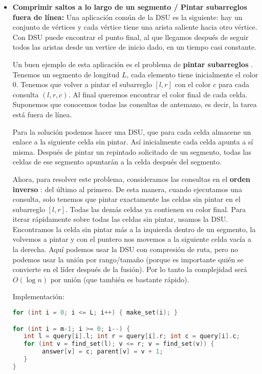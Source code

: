 \begin{itemize}
	 \item \textbf{Comprimir saltos a lo largo de un segmento / Pintar subarreglos fuera de línea:} Una aplicación común de la DSU es la siguiente: hay un conjunto de vértices y cada vértice tiene una arista saliente hacia otro vértice. Con DSU puede encontrar el punto final, al que llegamos después de seguir todos las aristas desde un vertice de inicio dado, en un tiempo casi constante.
	 
	 Un buen ejemplo de esta aplicación es el problema de \textbf{pintar subarreglos} . Tenemos un segmento de  
	 longitud $L$, cada elemento tiene inicialmente el color 0. Tenemos que volver a pintar el 
	 subarreglo $[l,r]$ con el color $c$ para cada consulta $(l, r, c)$. Al final queremos encontrar el color final de cada celda. Suponemos que conocemos todas las consultas de antemano, es decir, la tarea está fuera de línea.
	 
	 Para la solución podemos hacer una DSU, que para cada celda almacene un enlace a la siguiente celda sin pintar. Así inicialmente cada celda apunta a sí misma. Después de pintar un repintado solicitado de un segmento, todas las celdas de ese segmento apuntarán a la celda después del segmento.
	 
	 Ahora, para resolver este problema, consideramos las consultas en el \textbf{orden inverso} : del último al primero. De esta manera, cuando ejecutamos una consulta, solo tenemos que pintar exactamente las celdas sin pintar en el subarreglo $[l, r]$. Todas las demás celdas ya contienen su color final. Para iterar rápidamente sobre todas las celdas sin pintar, usamos la DSU. Encontramos la celda sin pintar más a la izquierda dentro de un segmento, la volvemos a pintar y con el puntero nos movemos a la siguiente celda vacía a la derecha. Aquí podemos usar la DSU con compresión de ruta, pero no podemos usar la unión por rango/tamaño (porque es importante quién se convierte en el líder después de la fusión). Por lo tanto la complejidad será $O(\log n)$ por unión (que también es bastante rápido).
	 
	 Implementación:
	 
	 \begin{lstlisting}[language=C++]
for (int i = 0; i <= L; i++) { make_set(i); }

for (int i = m-1; i >= 0; i--) {
   int l = query[i].l; int r = query[i].r; int c = query[i].c;
   for (int v = find_set(l); v <= r; v = find_set(v)) {
        answer[v] = c; parent[v] = v + 1;
   }
}
	 \end{lstlisting}
	 

\end{itemize}
